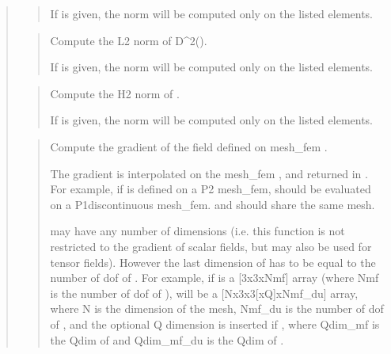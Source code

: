 \documentclass[a4paper,11pt,english]{sphinxmanual}
\begin{document}
\begin{quote}
\begin{quote}
If  is given, the norm will be computed only on the listed
elements.
\end{quote}

\begin{quote}

Compute the L2 norm of D\textasciicircum{}2().

If  is given, the norm will be computed only on the listed
elements.
\end{quote}

\begin{quote}

Compute the H2 norm of .

If  is given, the norm will be computed only on the listed
elements.
\end{quote}

\begin{quote}

Compute the gradient of the field  defined on mesh\_fem .

The gradient is interpolated on the mesh\_fem , and returned in
. For example, if  is defined on a P2 mesh\_fem,  should be
evaluated on a P1\sphinxhyphen{}discontinuous mesh\_fem.  and  should
share the same mesh.

 may have any number of dimensions (i.e. this function is not
restricted to the gradient of scalar fields, but may also be used
for tensor fields). However the last dimension of  has to be
equal to the number of dof of . For example, if  is a
{[}3x3xNmf{]} array (where Nmf is the number of dof of ),  will
be a {[}Nx3x3{[}xQ{]}xNmf\_du{]} array, where N is the dimension of the mesh,
Nmf\_du is the number of dof of , and the optional Q dimension
is inserted if , where Qdim\_mf is the Qdim of
 and Qdim\_mf\_du is the Qdim of .
\end{quote}


\end{quote}
\end{document}
